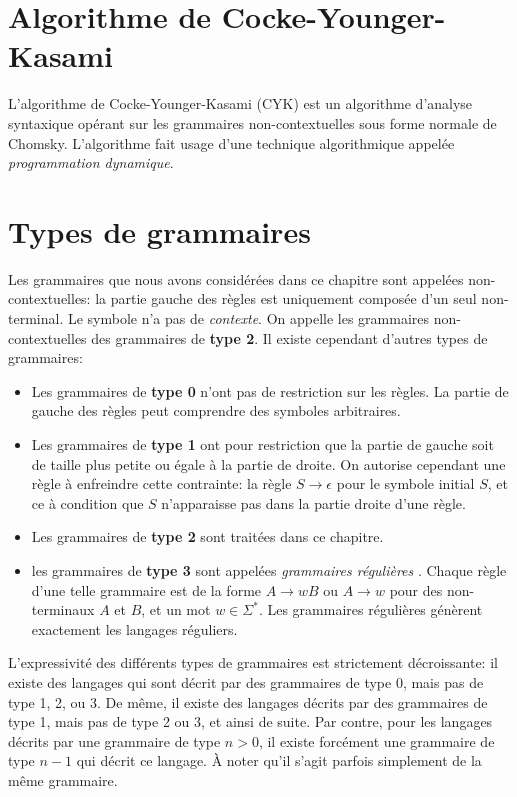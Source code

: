 \section{Algorithme de Cocke-Younger-Kasami}

L'algorithme de Cocke-Younger-Kasami (CYK) est un algorithme d'analyse syntaxique opérant sur les grammaires non-contextuelles sous forme normale de Chomsky. L'algorithme fait usage d'une technique algorithmique appelée \textit{programmation dynamique}.

\section{Types de grammaires}

Les grammaires que nous avons considérées dans ce chapitre sont appelées non-contextuelles:
la partie gauche des règles est uniquement composée d'un seul non-terminal.
Le symbole n'a pas de \textit{contexte}.
On appelle les grammaires non-contextuelles des grammaires de \textbf{type 2}.
Il existe cependant d'autres types de grammaires:
\begin{itemize}
\item Les grammaires de \textbf{type 0} n'ont pas de restriction sur les règles. La partie de gauche des règles peut comprendre des symboles arbitraires.
\item Les grammaires de \textbf{type 1} ont pour restriction que la partie de gauche soit de taille plus petite ou égale à la partie de droite.
On autorise cependant une règle à enfreindre cette contrainte: la règle $S \to \epsilon$ pour le symbole initial $S$, et ce à condition que $S$ n'apparaisse pas dans la partie droite d'une règle.
\item Les grammaires de \textbf{type 2} sont traitées dans ce chapitre.
\item les grammaires de \textbf{type 3} sont appelées \og \textit{grammaires régulières} \fg{}. Chaque règle d'une telle grammaire est de la forme $A \to wB$ ou $A \to w$ pour des non-terminaux $A$ et $B$, et un mot $w \in \Sigma^*$. Les grammaires régulières génèrent exactement les langages réguliers.
\end{itemize}
L'expressivité des différents types de grammaires est strictement décroissante:
il existe des langages qui sont décrit par des grammaires de type 0, mais pas de type 1, 2, ou 3.
De même, il existe des langages décrits par des grammaires de type 1, mais pas de type 2 ou 3, et ainsi de suite.
Par contre, pour les langages décrits par une grammaire de type $n > 0$, il existe forcément une grammaire de type $n - 1$ qui décrit ce langage.
À noter qu'il s'agit parfois simplement de la même grammaire.